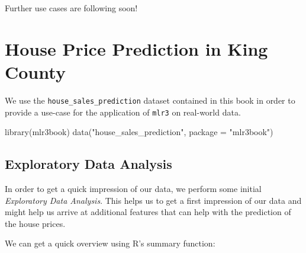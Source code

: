 \documentclass[12pt,]{scrbook}
\newenvironment{Shaded}{}{}
\newcommand{\DataTypeTok}[1]{#1}
\newcommand{\KeywordTok}[1]{\textcolor[rgb]{0.00,0.00,1.00}{#1}}
\newcommand{\NormalTok}[1]{#1}
\newcommand{\StringTok}[1]{\textcolor[rgb]{0.00,0.50,0.50}{#1}}
\begin{document}
Further use cases are following soon!

\hypertarget{use-case-regr-houses}{%
\section{House Price Prediction in King County}\label{use-case-regr-houses}}

We use the \texttt{house\_sales\_prediction} dataset contained in this book in order to provide a use-case for the application of \texttt{mlr3} on real-world data.

\begin{Shaded}
\begin{Highlighting}[]
\KeywordTok{library}\NormalTok{(mlr3book)}
\KeywordTok{data}\NormalTok{(}\StringTok{"house_sales_prediction"}\NormalTok{, }\DataTypeTok{package =} \StringTok{"mlr3book"}\NormalTok{)}
\end{Highlighting}
\end{Shaded}

\hypertarget{exploratory-data-analysis}{%
\subsection{Exploratory Data Analysis}\label{exploratory-data-analysis}}

In order to get a quick impression of our data, we perform some initial \emph{Exploratory Data Analysis}.
This helps us to get a first impression of our data and might help us arrive at additional features that can help with the prediction of the house prices.

We can get a quick overview using R's summary function:
\end{document}
